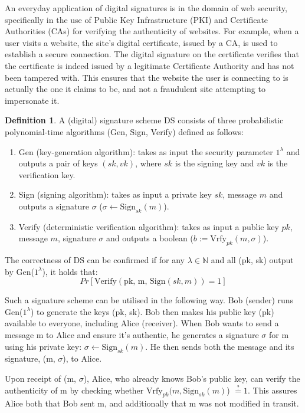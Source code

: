 \documentclass[]{final_report}
\theoremstyle{definition}
\newtheorem{definition}{Definition}[chapter]
\begin{document}
An everyday application of digital signatures is in the domain of web security, specifically in the use of Public Key Infrastructure (PKI) and Certificate Authorities (CAs) for verifying the authenticity of websites. For example, when a user visits a website, the site's digital certificate, issued by a CA, is used to establish a secure connection. The digital signature on the certificate verifies that the certificate is indeed issued by a legitimate Certificate Authority and has not been tampered with. This ensures that the website the user is connecting to is actually the one it claims to be, and not a fraudulent site attempting to impersonate it. 

\begin{definition}
\label{def:digital signature}
A (digital) signature scheme DS consists of three probabilistic polynomial-time algorithms (Gen, Sign, Verify) defined as follows:
\begin{enumerate}
    \item Gen (key-generation algorithm): takes as input the security parameter $1^\lambda$ and outputs a pair of keys $(sk ,vk)$, where $sk$ is the signing key and $vk$ is the verification key.
    \item Sign (signing algorithm): takes as input a private key $sk$, message $m$ and outputs a signature $\sigma$ ($\sigma \leftarrow \text{Sign}_{sk}(m)$).
    \item Verify (deterministic verification algorithm):  takes as input a public key $pk$, message $m$, signature $\sigma$ and outputs a boolean ($b := \text{Vrfy}_{pk}(m, \sigma)$).
\end{enumerate}
\end{definition}

The correctness of DS can be confirmed if for any $\lambda \in \mathbb{N}$ and all (pk, sk) output by Gen($1^\lambda$), it holds that: 
\[ Pr[\text{Verify}(\text{pk, m, Sign}(sk, m)) = 1]\]
 

Such a signature scheme can be utilised in the following way. 
Bob (sender) runs Gen($1^\lambda$) to generate the keys (pk, sk). Bob then makes his public key (pk) available to everyone, including Alice (receiver). 
When Bob wants to send a message m to Alice and ensure it's authentic, he generates a signature $\sigma$ for m using his private key: $\sigma \leftarrow \text{Sign}_{sk}(m)$. He then sends both the message and its signature, (m, $\sigma$), to Alice.

Upon receipt of (m, $\sigma$), Alice, who already knows Bob's public key, can verify the authenticity of m by checking whether $\text{Vrfy}_{pk} (m, \text{Sign}_{sk}(m)$) $\stackrel{?}{=} 1$. This assures Alice both that Bob sent m, and additionally that m was not modified in transit.
\end{document}
